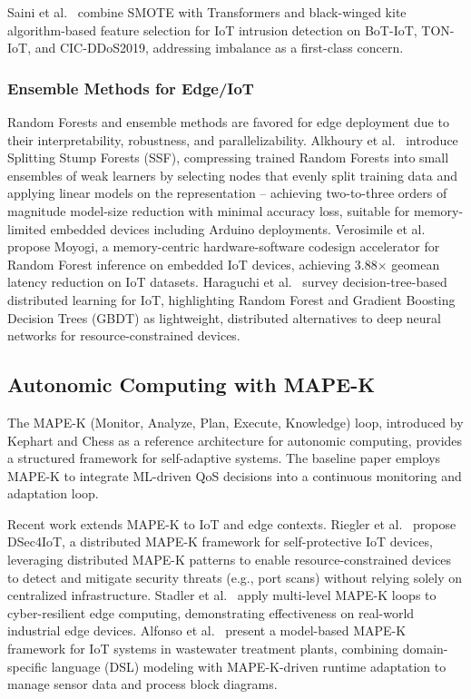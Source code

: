Saini et al.\ \cite{Saini25CSNT} combine SMOTE with Transformers and black-winged kite algorithm-based feature selection for IoT intrusion detection on BoT-IoT, TON-IoT, and CIC-DDoS2019, addressing imbalance as a first-class concern.

\subsubsection{Ensemble Methods for Edge/IoT}

Random Forests and ensemble methods are favored for edge deployment due to their interpretability, robustness, and parallelizability. Alkhoury et al.\ \cite{Alkhoury25ML} introduce Splitting Stump Forests (SSF), compressing trained Random Forests into small ensembles of weak learners by selecting nodes that evenly split training data and applying linear models on the representation -- achieving two-to-three orders of magnitude model-size reduction with minimal accuracy loss, suitable for memory-limited embedded devices including Arduino deployments. Verosimile et al.\ \cite{Verosimile25FCCM} propose Moyogi, a memory-centric hardware-software codesign accelerator for Random Forest inference on embedded IoT devices, achieving 3.88$\times$ geomean latency reduction on IoT datasets. Haraguchi et al.\ \cite{Haraguchi25JGRID} survey decision-tree-based distributed learning for IoT, highlighting Random Forest and Gradient Boosting Decision Trees (GBDT) as lightweight, distributed alternatives to deep neural networks for resource-constrained devices.

\subsection{Autonomic Computing with MAPE-K}
\label{subsec:mapek}

The MAPE-K (Monitor, Analyze, Plan, Execute, Knowledge) loop, introduced by Kephart and Chess \cite{KephartChess03} as a reference architecture for autonomic computing, provides a structured framework for self-adaptive systems. The baseline paper \cite{EtTousy26} employs MAPE-K to integrate ML-driven QoS decisions into a continuous monitoring and adaptation loop.

Recent work extends MAPE-K to IoT and edge contexts. Riegler et al.\ \cite{Riegler23SEAMS} propose DSec4IoT, a distributed MAPE-K framework for self-protective IoT devices, leveraging distributed MAPE-K patterns to enable resource-constrained devices to detect and mitigate security threats (e.g., port scans) without relying solely on centralized infrastructure. Stadler et al.\ \cite{Stadler24ICSA} apply multi-level MAPE-K loops to cyber-resilient edge computing, demonstrating effectiveness on real-world industrial edge devices. Alfonso et al.\ \cite{Alfonso23JOT} present a model-based MAPE-K framework for IoT systems in wastewater treatment plants, combining domain-specific language (DSL) modeling with MAPE-K-driven runtime adaptation to manage sensor data and process block diagrams.

